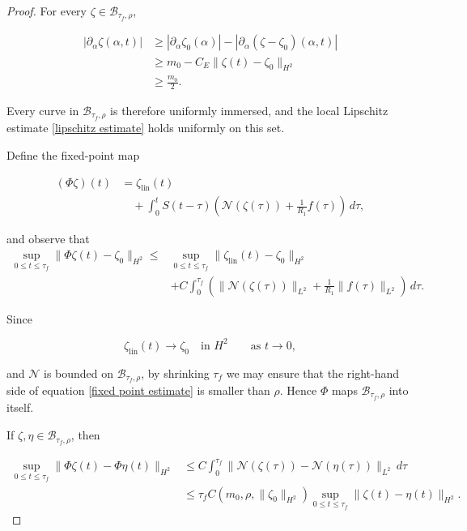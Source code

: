 \documentclass{article}[12pt]
\theoremstyle{Theorem}
\begin{document}
\begin{proof}
For every \(\zeta\in\mathcal B_{\tau_f,\rho}\),

$$
\begin{aligned}
    |\partial_\alpha\zeta(\alpha,t)|
    &\geq
    |\partial_\alpha\zeta_0(\alpha)|
    -
    |\partial_\alpha(\zeta-\zeta_0)(\alpha,t)|\\
    &\geq
    m_0-C_E\|\zeta(t)-\zeta_0\|_{H^2}\\
    &\geq\frac{m_0}{2}.
\end{aligned}
$$

Every curve in \(\mathcal B_{\tau_f,\rho}\) is therefore uniformly immersed, and the local Lipschitz estimate
\eqref{lipschitz estimate} holds uniformly on this set.
\newline

Define the fixed-point map

$$
\begin{aligned}
    (\Phi\zeta)(t)
    &=
    \zeta_{\mathrm{lin}}(t)\\
    &\quad+
    \int_0^t
    S(t-\tau)
    \left(
        \mathcal N(\zeta(\tau))
        +\frac{1}{R_1}f(\tau)
    \right)\,d\tau,
\end{aligned}
$$

and observe that 
\begin{equation}
\begin{aligned}
    \sup_{0\leq t\leq \tau_f}
    \|\Phi\zeta(t)-\zeta_0\|_{H^2}
    \leq{}&
    \sup_{0\leq t\leq \tau_f}
    \|\zeta_{\mathrm{lin}}(t)-\zeta_0\|_{H^2}\\
    &+
    C\int_0^{\tau_f}
    \left(
        \|\mathcal N(\zeta(\tau))\|_{L^2}
        +\frac{1}{R_1}\|f(\tau)\|_{L^2}
    \right)\,d\tau.
    \label{fixed point estimate}
\end{aligned}
\end{equation}

Since

$$
    \zeta_{\mathrm{lin}}(t)\longrightarrow\zeta_0
    \quad\text{in }H^2
    \qquad\text{as }t\to0,
$$

and \(\mathcal N\) is bounded on \(\mathcal B_{\tau_f,\rho}\), by shrinking \(\tau_f\) we may ensure that the right-hand side of equation \eqref{fixed point estimate} is smaller than \(\rho\). Hence \(\Phi\) maps \(\mathcal B_{\tau_f,\rho}\) into itself.
\newline

If \(\zeta,\eta\in\mathcal B_{\tau_f,\rho}\), then

$$
\begin{aligned}
    \sup_{0\leq t\leq \tau_f}
    \|\Phi\zeta(t)-\Phi\eta(t)\|_{H^2}
    &\leq
    C\int_0^{\tau_f}
    \|
        \mathcal N(\zeta(\tau))
        -
        \mathcal N(\eta(\tau))
    \|_{L^2}\,d\tau\\
    &\leq
    \tau_fC(m_0,\rho,\|\zeta_0\|_{H^2})
    \sup_{0\leq t\leq \tau_f}
    \|\zeta(t)-\eta(t)\|_{H^2}.
\end{aligned}
$$


\end{proof}
\end{document}
